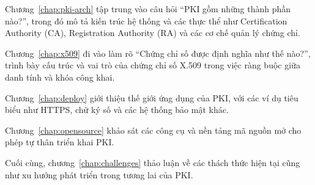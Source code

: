 Chương~\ref{chap:pki-arch} tập trung vào câu hỏi “PKI gồm những thành phần nào?”, trong đó mô tả kiến trúc hệ thống và các thực thể như Certification Authority (CA), Registration Authority (RA) và các cơ chế quản lý chứng chỉ.

Chương~\ref{chap:x509} đi vào làm rõ “Chứng chỉ số được định nghĩa như thế nào?”, trình bày cấu trúc và vai trò của chứng chỉ số X.509 trong việc ràng buộc giữa danh tính và khóa công khai.

Chương~\ref{chap:deploy} giới thiệu thế giới ứng dụng của PKI, với các ví dụ tiêu biểu như HTTPS, chữ ký số và các hệ thống bảo mật khác.

Chương~\ref{chap:opensource} khảo sát các công cụ và nền tảng mã nguồn mở cho phép tự thân triển khai PKI.

Cuối cùng, chương~\ref{chap:challenges} thảo luận về các thách thức hiện tại cũng như xu hướng phát triển trong tương lai của PKI.
